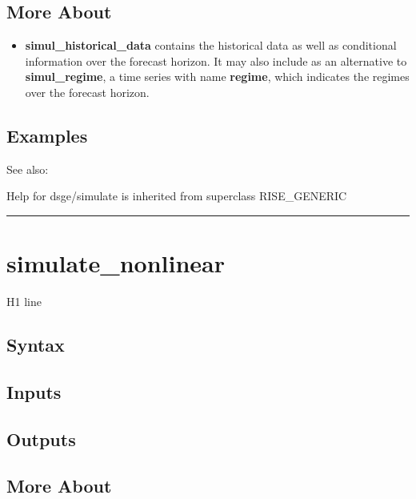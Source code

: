 \documentclass[letterpaper,10pt,english]{sphinxmanual}
\begin{document}
\subsection{More About}
\label{classes/models/@dsge/dsge:id174}\begin{itemize}
\item {} 
\textbf{simul\_historical\_data} contains the historical data as well as
conditional information over the forecast horizon. It may also include
as an alternative to \textbf{simul\_regime}, a time series with name
\textbf{regime}, which indicates the regimes over the forecast horizon.

\end{itemize}


\subsection{Examples}
\label{classes/models/@dsge/dsge:id175}
See also:

Help for dsge/simulate is inherited from superclass RISE\_GENERIC


\bigskip\hrule{}\bigskip



\section{simulate\_nonlinear}
\label{classes/models/@dsge/dsge:id176}\label{classes/models/@dsge/dsge:simulate-nonlinear}
H1 line


\subsection{Syntax}
\label{classes/models/@dsge/dsge:id177}

\subsection{Inputs}
\label{classes/models/@dsge/dsge:id178}

\subsection{Outputs}
\label{classes/models/@dsge/dsge:id179}

\subsection{More About}
\label{classes/models/@dsge/dsge:id180}
\end{document}
